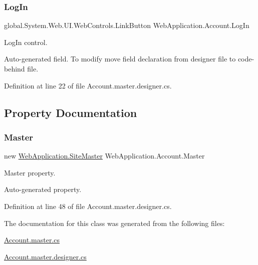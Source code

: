 \mbox{\label{classWebApplication_1_1Account_acf1883724583703dee1d49d5e7f8c9c8}} 
\subsubsection{\texorpdfstring{LogIn}{LogIn}}
{\footnotesize\ttfamily global.\+System.\+Web.\+U\+I.\+Web\+Controls.\+Link\+Button Web\+Application.\+Account.\+Log\+In\hspace{0.3cm}{\ttfamily [protected]}}



Log\+In control. 

Auto-\/generated field. To modify move field declaration from designer file to code-\/behind file. 

Definition at line 22 of file Account.\+master.\+designer.\+cs.



\subsection{Property Documentation}
\mbox{\label{classWebApplication_1_1Account_adc7988cc207da465340c81ceeda4c7cf}} 
\subsubsection{\texorpdfstring{Master}{Master}}
{\footnotesize\ttfamily new \mbox{\hyperlink{classWebApplication_1_1SiteMaster}{Web\+Application.\+Site\+Master}} Web\+Application.\+Account.\+Master\hspace{0.3cm}{\ttfamily [get]}}



Master property. 

Auto-\/generated property. 

Definition at line 48 of file Account.\+master.\+designer.\+cs.



The documentation for this class was generated from the following files\+:\begin{DoxyCompactItemize}
\item 
\mbox{\hyperlink{Account_8master_8cs}{Account.\+master.\+cs}}\item 
\mbox{\hyperlink{Account_8master_8designer_8cs}{Account.\+master.\+designer.\+cs}}\end{DoxyCompactItemize}
